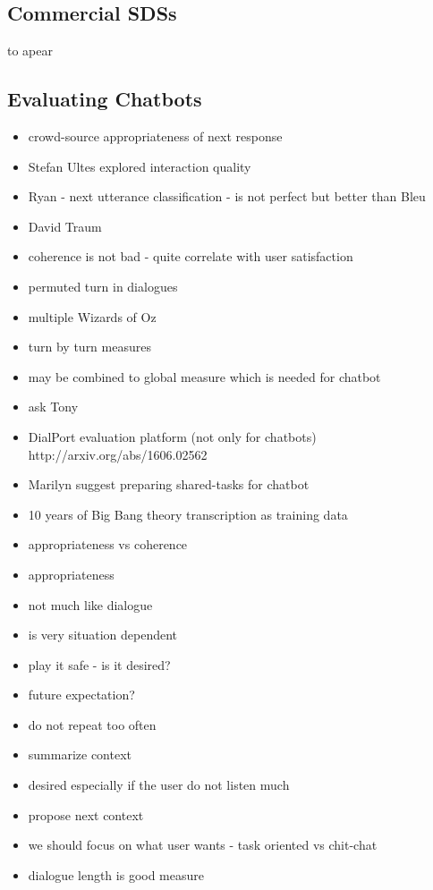 \documentclass[12pt]{article}
\begin{document}
\subsection{Commercial SDSs}
to apear

\subsection{Evaluating Chatbots}

\begin{itemize}
\item crowd-source appropriateness of next response
\item Stefan Ultes explored interaction quality
\item Ryan - next utterance classification - is not perfect but better than Bleu
\item David Traum
    \item coherence is not bad - quite correlate with user satisfaction
    \item permuted turn in dialogues
    \item multiple Wizards of Oz
\item turn by turn measures
    \item may be combined to global measure which is needed for chatbot
\item ask Tony
    \item DialPort evaluation platform (not only for chatbots) http://arxiv.org/abs/1606.02562
\item Marilyn suggest preparing shared-tasks for chatbot
    \item 10 years of Big Bang theory transcription as training data
\item appropriateness vs coherence
    \item appropriateness
        \item not much like dialogue
        \item is very situation dependent
\item play it safe - is it desired?
    \item future expectation?
    \item do not repeat too often
\item summarize context
    \item desired especially if the user do not listen much
    \item propose next context
\item we should focus on what user wants - task oriented vs chit-chat
    \item dialogue length is good measure
\end{itemize}
\end{document}
